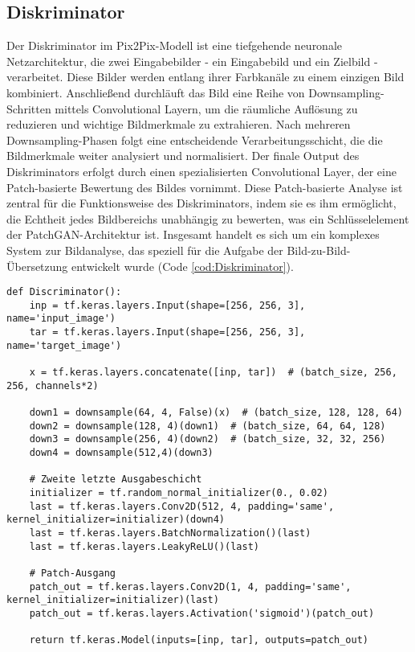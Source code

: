 \subsection{Diskriminator}
Der Diskriminator im Pix2Pix-Modell ist eine tiefgehende neuronale Netzarchitektur, die zwei Eingabebilder - ein Eingabebild und ein Zielbild - verarbeitet. Diese Bilder werden entlang ihrer Farbkanäle zu einem einzigen Bild kombiniert. Anschließend durchläuft das Bild eine Reihe von Downsampling-Schritten mittels Convolutional Layern, um die räumliche Auflösung zu reduzieren und wichtige Bildmerkmale zu extrahieren. Nach mehreren Downsampling-Phasen folgt eine entscheidende Verarbeitungsschicht, die die Bildmerkmale weiter analysiert und normalisiert. Der finale Output des Diskriminators erfolgt durch einen spezialisierten Convolutional Layer, der eine Patch-basierte Bewertung des Bildes vornimmt. Diese Patch-basierte Analyse ist zentral für die Funktionsweise des Diskriminators, indem sie es ihm ermöglicht, die Echtheit jedes Bildbereichs unabhängig zu bewerten, was ein Schlüsselelement der PatchGAN-Architektur ist. Insgesamt handelt es sich um ein komplexes System zur Bildanalyse, das speziell für die Aufgabe der Bild-zu-Bild-Übersetzung entwickelt wurde (Code \ref{cod:Diskriminator}).

\begin{lstlisting}[language=pyhaff, caption={Diskriminator Pix2Pix}, label={cod:Diskriminator}]
def Discriminator():
	inp = tf.keras.layers.Input(shape=[256, 256, 3], name='input_image')
	tar = tf.keras.layers.Input(shape=[256, 256, 3], name='target_image')
	
	x = tf.keras.layers.concatenate([inp, tar])  # (batch_size, 256, 256, channels*2)
	
	down1 = downsample(64, 4, False)(x)  # (batch_size, 128, 128, 64)
	down2 = downsample(128, 4)(down1)  # (batch_size, 64, 64, 128)
	down3 = downsample(256, 4)(down2)  # (batch_size, 32, 32, 256)
	down4 = downsample(512,4)(down3)
	
	# Zweite letzte Ausgabeschicht
	initializer = tf.random_normal_initializer(0., 0.02)
	last = tf.keras.layers.Conv2D(512, 4, padding='same', kernel_initializer=initializer)(down4)
	last = tf.keras.layers.BatchNormalization()(last)
	last = tf.keras.layers.LeakyReLU()(last)
	
	# Patch-Ausgang
	patch_out = tf.keras.layers.Conv2D(1, 4, padding='same', kernel_initializer=initializer)(last)
	patch_out = tf.keras.layers.Activation('sigmoid')(patch_out)
	
	return tf.keras.Model(inputs=[inp, tar], outputs=patch_out)
\end{lstlisting}


